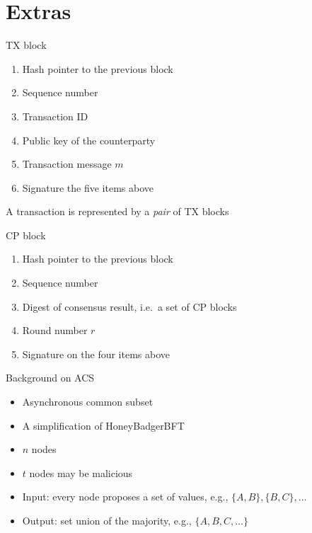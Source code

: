 \documentclass{beamer}
\begin{document}
\section*{Extras}
\begin{frame}[noframenumbering]{TX block}
  \begin{enumerate}
    \item Hash pointer to the previous block
    \item Sequence number
    \item Transaction ID
    \item Public key of the counterparty
    \item Transaction message $m$
    \item Signature the five items above
  \end{enumerate}
  \vfill
  A transaction is represented by a \emph{pair} of TX blocks
\end{frame}

\begin{frame}[noframenumbering]{CP block}
  \begin{enumerate}
    \item Hash pointer to the previous block
    \item Sequence number
    \item Digest of consensus result, i.e.~a set of CP blocks
    \item Round number $r$
    \item Signature on the four items above
  \end{enumerate}
\end{frame}

\begin{frame}[noframenumbering]{Background on ACS}
  \begin{itemize}
    \item Asynchronous common subset
    \item A simplification of HoneyBadgerBFT~\cite{miller2016honey}
    \item $n$ nodes
    \item $t$ nodes may be malicious
    \item Input: every node proposes a set of values, e.g., $\{A, B\}, \{B, C\}, \dots$
    \item Output: set union of the majority, e.g., $\{A, B, C, \dots \}$
  \end{itemize}
\end{frame}
\end{document}
